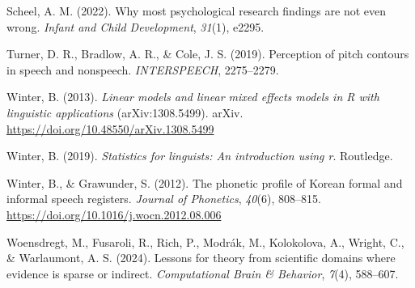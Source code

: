 \documentclass[
  doc,
  floatsintext,
  longtable,
  nolmodern,
  notxfonts,
  notimes,
  colorlinks=true,linkcolor=blue,citecolor=blue,urlcolor=blue]{apa7}
\newlength{\cslhangindent}
\newenvironment{CSLReferences}[2] %
 {\begin{list}{}{%
  \setlength{\itemindent}{0pt}
  \setlength{\leftmargin}{0pt}
  \setlength{\parsep}{0pt}
  \ifodd #1
   \setlength{\leftmargin}{\cslhangindent}
   \setlength{\itemindent}{-1\cslhangindent}
  \fi
  \setlength{\itemsep}{#2\baselineskip}}}
 {\end{list}}
\begin{document}
\begin{CSLReferences}{1}{0}
Scheel, A. M. (2022). Why most psychological research findings are not
even wrong. \emph{Infant and Child Development}, \emph{31}(1), e2295.

Turner, D. R., Bradlow, A. R., \& Cole, J. S. (2019). Perception of
pitch contours in speech and nonspeech. \emph{INTERSPEECH}, 2275--2279.

Winter, B. (2013). \emph{Linear models and linear mixed effects models
in {R} with linguistic applications} (arXiv:1308.5499). arXiv.
\url{https://doi.org/10.48550/arXiv.1308.5499}

Winter, B. (2019). \emph{Statistics for linguists: An introduction using
r}. Routledge.

Winter, B., \& Grawunder, S. (2012). The phonetic profile of {Korean}
formal and informal speech registers. \emph{Journal of Phonetics},
\emph{40}(6), 808--815. \url{https://doi.org/10.1016/j.wocn.2012.08.006}

Woensdregt, M., Fusaroli, R., Rich, P., Modrák, M., Kolokolova, A.,
Wright, C., \& Warlaumont, A. S. (2024). Lessons for theory from
scientific domains where evidence is sparse or indirect.
\emph{Computational Brain \& Behavior}, \emph{7}(4), 588--607.

\end{CSLReferences}
\end{document}
